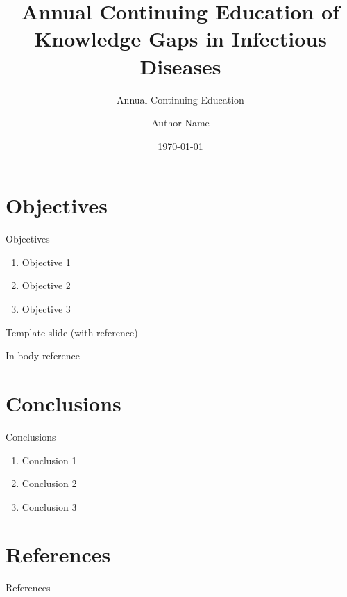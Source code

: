\documentclass[aspectratio=169]{beamer}
\title[Annual CE: Knowledge Gaps in ID]{Annual Continuing Education of Knowledge Gaps in Infectious Diseases}
\subtitle{Annual Continuing Education}
\author{Author Name}
\institute{Institution}
\date{\today}
\newcommand{\BottomLeftReference}{}
\newcommand{\setbottomleftreference}[1]{\def\BottomLeftReference{#1}}
\begin{document}
\begin{frame}
  \titlepage
\end{frame}

\section{Objectives}
\begin{frame}{Objectives}
  \begin{enumerate}
    \item Objective 1
    \item Objective 2
    \item Objective 3
  \end{enumerate}
\end{frame}

{
\setbottomleftreference{\parbox[t]{.75\paperwidth}{\raggedright\scriptsize\fullcite{doe2020example}}}
\begin{frame}{Template slide (with reference)}
  \begin{block}{In-body reference}
  \end{block}
\end{frame}
}

\section{Conclusions}
\begin{frame}{Conclusions}
  \begin{enumerate}
    \item Conclusion 1
    \item Conclusion 2
    \item Conclusion 3
  \end{enumerate}
\end{frame}

\section{References}
\begin{frame}[allowframebreaks]{References}
  \nocite{*}
  \printbibliography
\end{frame}
\end{document}
